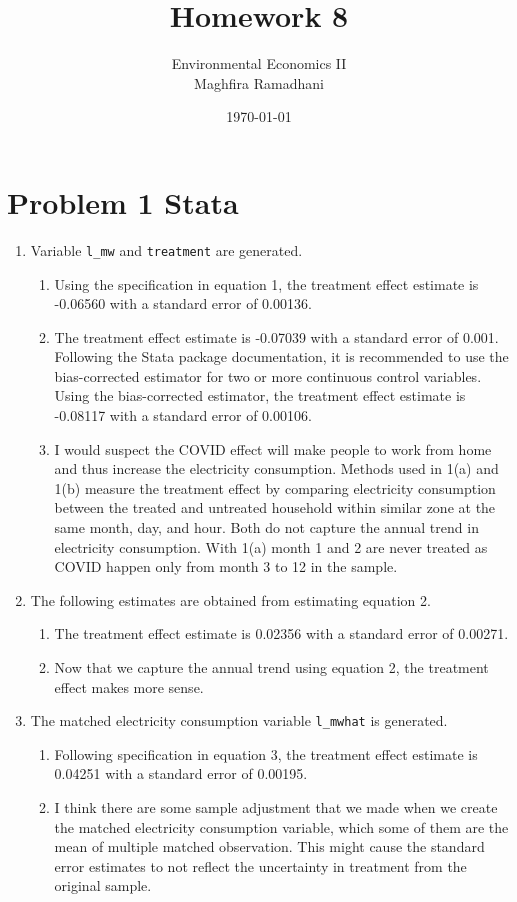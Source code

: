 \documentclass{article}
\begin{document}
 
\title{Homework 8}
\author{Environmental Economics II\\
Maghfira Ramadhani}
\date{\today}
\maketitle

\section*{Problem 1 Stata}
\begin{enumerate}
\item Variable \verb!l_mw! and \verb!treatment! are generated.
\begin{enumerate}
    \item Using the specification in equation 1, the treatment effect estimate is -0.06560 with a standard error of 0.00136.
    \item The treatment effect estimate is -0.07039 with a standard error of 0.001. Following the Stata package documentation, it is recommended to use the bias-corrected estimator for two or more continuous control variables. Using the bias-corrected estimator, the treatment effect estimate is -0.08117 with a standard error of 0.00106. 
    \item I would suspect the COVID effect will make people to work from home and thus increase the electricity consumption. Methods used in 1(a) and 1(b) measure the treatment effect by comparing electricity consumption between the treated and untreated household within similar zone at the same month, day, and hour. Both do not capture the annual trend in electricity consumption. With 1(a) month 1 and 2 are never treated as COVID happen only from month 3 to 12 in the sample.
\end{enumerate}
\item The following estimates are obtained from estimating equation 2.
\begin{enumerate}
    \item The treatment effect estimate is 0.02356 with a standard error of 0.00271.
    \item Now that we capture the annual trend using equation 2, the treatment effect makes more sense.
\end{enumerate}
\item The matched electricity consumption variable \verb!l_mwhat! is generated.
\begin{enumerate}
    \item Following specification in equation 3, the treatment effect estimate is 0.04251 with a standard error of 0.00195.
    \item I think there are some sample adjustment that we made when we create the matched electricity consumption variable, which some of them are the mean of multiple matched observation. This might cause the standard error estimates to not reflect the uncertainty in treatment from the original sample.
\end{enumerate}    
\end{enumerate}
\end{document}
